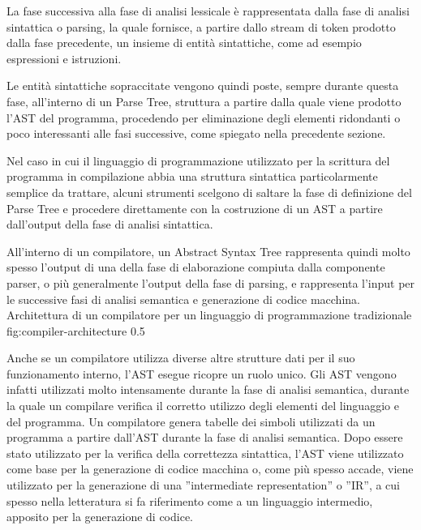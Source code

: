La fase successiva alla fase di analisi lessicale è rappresentata dalla fase di
analisi sintattica o parsing, la quale fornisce, a partire dallo stream di
token prodotto dalla fase precedente, un insieme di entità sintattiche, come ad
esempio espressioni e istruzioni.

Le entità sintattiche sopraccitate vengono quindi poste, sempre durante questa
fase, all’interno di un Parse Tree, struttura a partire dalla quale viene
prodotto l’AST del programma, procedendo per eliminazione degli elementi
ridondanti o poco interessanti alle fasi successive, come spiegato nella
precedente sezione.

Nel caso in cui il linguaggio di programmazione utilizzato per la scrittura del
programma in compilazione abbia una struttura sintattica particolarmente
semplice da trattare, alcuni strumenti scelgono di saltare la fase di
definizione del Parse Tree e procedere direttamente con la costruzione di un
AST a partire dall’output della fase di analisi sintattica.

All’interno di un compilatore, un Abstract Syntax Tree rappresenta quindi molto
spesso l’output di una della fase di elaborazione compiuta dalla componente
parser, o più generalmente l’output della fase di parsing, e rappresenta
l’input per le successive fasi di analisi semantica e generazione di codice
macchina. \\

      {Architettura di un compilatore per un linguaggio di programmazione
      tradizionale}
      {fig:compiler-architecture}
      {0.5}

Anche se un compilatore utilizza diverse altre strutture dati per il suo
funzionamento interno, l’AST esegue ricopre un ruolo unico. Gli AST vengono
infatti utilizzati molto intensamente durante la fase di analisi semantica,
durante la quale un compilare verifica il corretto utilizzo degli elementi del
linguaggio e del programma. Un compilatore genera tabelle dei simboli
utilizzati da un programma a partire dall’AST durante la fase di analisi
semantica. Dopo essere stato utilizzato per la verifica della correttezza
sintattica, l’AST viene utilizzato come base per la generazione di codice
macchina o, come più spesso accade, viene utilizzato per la generazione di una
”intermediate representation” o ”IR”, a cui spesso nella letteratura si fa
riferimento come a un linguaggio intermedio, apposito per la generazione di
codice. \\

